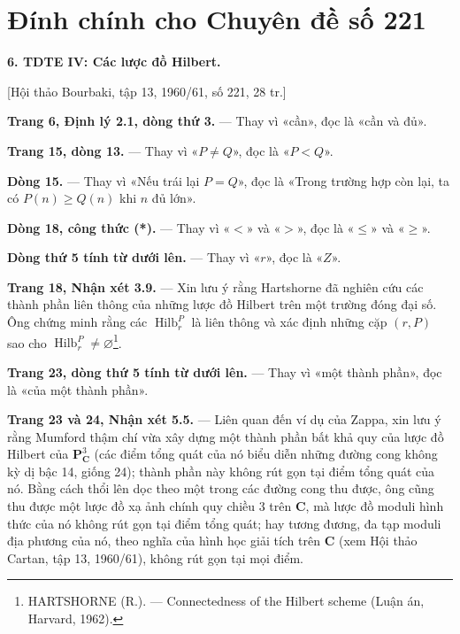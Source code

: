 \clearpage
\chapter*{Đính chính cho Chuyên đề số 221}
\setcounter{footnote}{3}

\noindent\textbf{6. TDTE IV: Các lược đồ Hilbert.}

\begin{center}
[Hội thảo Bourbaki, tập 13, 1960/61, số 221, 28 tr.]
\end{center}

\noindent\textbf{Trang 6, Định lý 2.1, dòng thứ 3.} --- Thay vì
«cần», đọc là «cần và đủ».

\noindent\textbf{Trang 15, dòng 13.} --- Thay vì «$P\neq Q$», đọc là
«$P<Q$».

\noindent\textbf{Dòng 15.} --- Thay vì «Nếu trái lại $P=Q$», đọc là
«Trong trường hợp còn lại, ta có $P(n)\geq Q(n)$ khi $n$ đủ lớn».

\noindent\textbf{Dòng 18, công thức (*).} --- Thay vì «$<$» và «$>$»,
đọc là «$\leq$» và «$\geq$».

\noindent\textbf{Dòng thứ 5 tính từ dưới lên.} --- Thay vì «$r$», đọc là
«$Z$».

\noindent\textbf{Trang 18, Nhận xét 3.9.} --- Xin lưu ý rằng Hartshorne đã
nghiên cứu các thành phần liên thông của những lược đồ Hilbert trên một trường
đóng đại số. Ông chứng minh rằng các $\operatorname{Hilb}^{P}_{r}$ là liên
thông và xác định những cặp $(r,P)$ sao cho
$\operatorname{Hilb}^{P}_{r}\neq\varnothing$\footnote{HARTSHORNE
(R.). --- Connectedness of the Hilbert scheme (Luận án, Harvard, 1962).}.

\noindent\textbf{Trang 23, dòng thứ 5 tính từ dưới lên.} --- Thay vì «một
thành phần», đọc là «của một thành phần».

\noindent\textbf{Trang 23 và 24, Nhận xét 5.5.} --- Liên quan đến ví dụ của
Zappa, xin lưu ý rằng Mumford thậm chí vừa xây dựng một thành phần bất khả quy
của lược đồ Hilbert của $\mathbf P^3_{\mathbf C}$ (các điểm tổng quát của nó
biểu diễn những đường cong không kỳ dị bậc 14, giống 24); thành phần này không
rút gọn tại điểm tổng quát của nó. Bằng cách thổi lên dọc theo một trong các
đường cong thu được, ông cũng thu được một lược đồ xạ ảnh chính quy chiều 3
trên $\mathbf C$, mà lược đồ moduli hình thức của nó không rút gọn tại điểm
tổng quát; hay tương đương, đa tạp moduli địa phương của nó, theo nghĩa của
hình học giải tích trên $\mathbf C$ (xem Hội thảo Cartan, tập 13, 1960/61),
không rút gọn tại mọi điểm.

\par
